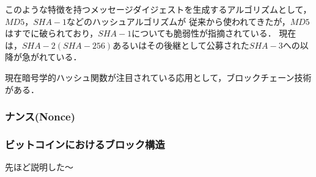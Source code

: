 \documentclass[a4paper,12pt]{jsarticle}
\begin{document}
このような特徴を持つメッセージダイジェストを生成するアルゴリズムとして，$MD5$，$SHA-1$などのハッシュアルゴリズムが
従来から使われてきたが，$MD5$はすでに破られており，$SHA-1$についても脆弱性が指摘されている．
現在は，$SHA-2(SHA-256)$あるいはその後継として公募された$SHA-3$への以降が急がれている．

現在暗号学的ハッシュ関数が注目されている応用として，ブロックチェーン技術がある．




      \subsubsection{ナンス(Nonce)}

      \subsubsection{ビットコインにおけるブロック構造}
先ほど説明した～
\end{document}
